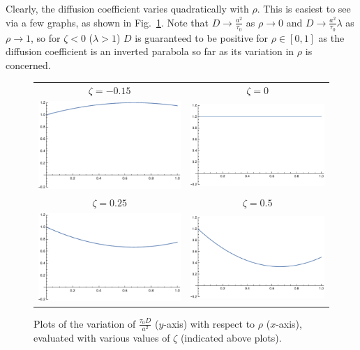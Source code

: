 Clearly, the diffusion coefficient varies quadratically with $\rho$. This is easiest to see via a few graphs, as shown in Fig.~\ref{fig:analDiffCoeffs}. Note that $D \rightarrow \frac{a^2}{\tau_0}$ as $\rho \rightarrow 0$
and $D \rightarrow \frac{a^2}{\tau_0} \lambda$ as $\rho \rightarrow 1$, so for $\zeta < 0$ ($\lambda>1$) $D$ is guaranteed to be positive for $\rho \in [0, 1]$ as the diffusion coefficient is an inverted parabola so far as its
variation in $\rho$ is concerned.
\begin{figure}[h!]
\caption[Some plots of the variation of the MFT diffusion coefficient with density, for some selected $\lambda$.]{\label{fig:analDiffCoeffs} Plots of the variation of $\frac{\tau_0 D}{a^2}$ ($y$-axis) with respect to $\rho$ ($x$-axis), evaluated with various values of $\zeta$ (indicated above plots).}
\begin{center}
 \begin{tabular}{c c}
     $\zeta = -0.15$ & $\zeta = 0$ \\ 
     \includegraphics[width=0.49\linewidth]{analytics/images/diffCoeffs/diffCoeff-neg0-15}  & \includegraphics[width=0.49 \linewidth]{analytics/images/diffCoeffs/diffCoeff-0-0} \\
     $\zeta = 0.25$  & $\zeta = 0.5$ \\
     \includegraphics[width=0.49\linewidth]{analytics/images/diffCoeffs/diffCoeff-0-25}  & \includegraphics[width=0.49 \linewidth]{analytics/images/diffCoeffs/diffCoeff-0-5} \\

\end{tabular}
\end{center}
\end{figure}
